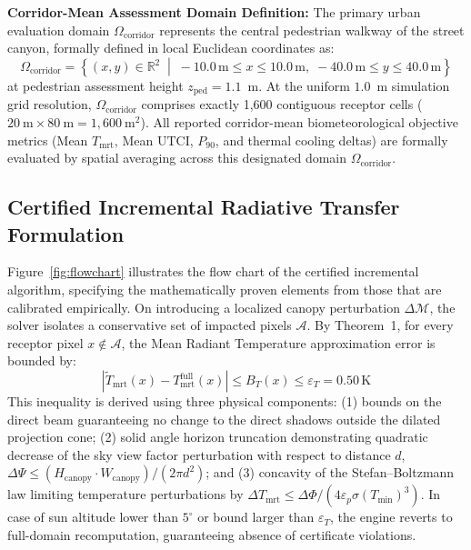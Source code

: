 \documentclass[conference]{IEEEtran}
\newcommand{\Tmrt}{T_{\mathrm{mrt}}}
\newcommand{\UTCI}{\mathrm{UTCI}}
\begin{document}
\textbf{Corridor-Mean Assessment Domain Definition:} The primary urban evaluation domain $\Omega_{\mathrm{corridor}}$ represents the central pedestrian walkway of the street canyon, formally defined in local Euclidean coordinates as:
\begin{equation}
\Omega_{\mathrm{corridor}} = \left\{ (x, y) \in \mathbb{R}^2 \;\middle|\; -10.0\,\mathrm{m} \le x \le 10.0\,\mathrm{m}, \; -40.0\,\mathrm{m} \le y \le 40.0\,\mathrm{m} \right\}
\end{equation}
at pedestrian assessment height $z_{\mathrm{ped}} = 1.1$~m. At the uniform $1.0$~m simulation grid resolution, $\Omega_{\mathrm{corridor}}$ comprises exactly 1,600 contiguous receptor cells ($20~\mathrm{m} \times 80~\mathrm{m} = 1,600~\mathrm{m}^2$). All reported corridor-mean biometeorological objective metrics (Mean $\Tmrt$, Mean $\UTCI$, $P_{90}$, and thermal cooling deltas) are formally evaluated by spatial averaging across this designated domain $\Omega_{\mathrm{corridor}}$.

\subsection{Certified Incremental Radiative Transfer Formulation}
Figure~\ref{fig:flowchart} illustrates the flow chart of the certified incremental algorithm, specifying the mathematically proven elements from those that are calibrated empirically. On introducing a localized canopy perturbation $\Delta\mathcal{M}$, the solver isolates a conservative set of impacted pixels $\mathcal{A}$. By Theorem~1, for every receptor pixel $x \notin \mathcal{A}$, the Mean Radiant Temperature approximation error is bounded by:
\begin{equation}
|\widetilde{T}_{\mathrm{mrt}}(x) - T_{\mathrm{mrt}}^{\mathrm{full}}(x)| \le B_T(x) \le \varepsilon_T = 0.50\,\mathrm{K}
\end{equation}
This inequality is derived using three physical components: (1) bounds on the direct beam guaranteeing no change to the direct shadows outside the dilated projection cone; (2) solid angle horizon truncation demonstrating quadratic decrease of the sky view factor perturbation with respect to distance $d$, $\Delta\Psi \le (H_{\mathrm{canopy}} \cdot W_{\mathrm{canopy}})/(2\pi d^2)$; and (3) concavity of the Stefan--Boltzmann law limiting temperature perturbations by $\Delta\Tmrt \le \Delta\Phi/(4\varepsilon_p\sigma(T_{\min})^3)$. In case of sun altitude lower than $5^\circ$ or bound larger than $\varepsilon_T$, the engine reverts to full-domain recomputation, guaranteeing absence of certificate violations.
\end{document}
